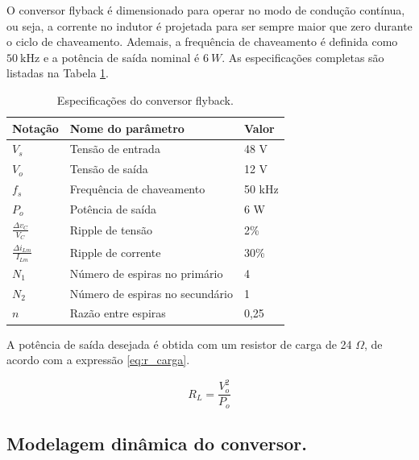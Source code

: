 \documentclass{article}
\begin{document}
O conversor flyback é dimensionado para operar no modo de condução contínua, ou seja, a corrente no indutor é projetada para ser sempre maior que zero durante o ciclo de chaveamento. Ademais, a frequência de chaveamento é definida como \(50\ \mathrm{kHz}\) e a potência de saída nominal é \(6\ W\). As especificações completas são listadas na Tabela \ref{tab:specs}.

\begin{table}[h]
\centering
\caption{Especificações do conversor flyback.}
\label{tab:specs}
\begin{tabular}{|l|l|l|}
\hline
Notação                      & Nome do parâmetro               & Valor  \\ \hline
\(V_s\)                      & Tensão de entrada               & 48 V   \\ \hline
\(V_o\)                      & Tensão de saída                 & 12 V   \\ \hline
\(f_s\)                      & Frequência de chaveamento       & 50 kHz \\ \hline
\(P_o\)                      & Potência de saída               & 6 W    \\ \hline
\(\frac{\Delta v_C}{V_C}\)       & Ripple de tensão                & 2\%    \\ \hline
\(\frac{\Delta i_{Lm}}{I_{Lm}}\) & Ripple de corrente              & 30\%   \\ \hline
\(N_1\)                      & Número de espiras no primário   & 4      \\ \hline
\(N_2\)                      & Número de espiras no secundário & 1      \\ \hline
\(n\)                        & Razão entre espiras             & 0,25   \\ \hline
\end{tabular}
\end{table}

A potência de saída desejada é obtida com um resistor de carga de 24 \(\Omega\), de acordo com  a expressão \eqref{eq:r_carga}.

\begin{equation}
  R_L = \frac{V_o^2}{P_o}
  \label{eq:r_carga}
\end{equation}

\subsection{Modelagem dinâmica do conversor.}
\end{document}
